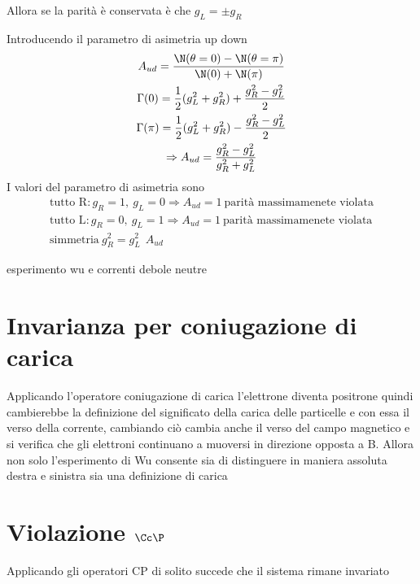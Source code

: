 \documentclass[12pt]{book}
\begin{document}
Allora se la parità è conservata è che $g_L = \pm g_R$

Introducendo il parametro di asimetria up down
\begin{gather}
	A_{ud} = \frac{\N (\theta=0) - \N(\theta=\pi)}{\N(0)+\N(\pi)}\\
	\Gamma (0) = \frac{1}{2} (g_L^2 + g_R^2) + \frac{g_R^2-g_L^2}{2}\\
	\Gamma (\pi) = \frac{1}{2} (g_L^2+g_R^2)- \frac{g_R^2-g_L^2}{2}\\
	\Rightarrow A_{ud} = \frac{g_R^2-g_L^2}{g_R^2+g_L^2}
\end{gather}
I valori del parametro di asimetria sono
\begin{gather}
	\text{tutto R}: g_R=1, \ g_L =0 \Rightarrow A_{ud}=1 \ \text{parità massimamenete violata}\\
	\text{tutto L}: g_R=0, \ g_L =1 \Rightarrow A_{ud}=1 \ \text{parità massimamenete violata}\\
	\text{simmetria} \ g_R^2 =g_L^2 \ \ A_{ud}
\end{gather}



esperimento wu e correnti debole neutre 


\section{Invarianza per coniugazione di carica}
Applicando l'operatore coniugazione di carica l'elettrone diventa positrone quindi cambierebbe la definizione del significato della carica delle particelle e con essa il verso della corrente, cambiando ciò cambia anche il verso del campo magnetico e si verifica che gli elettroni continuano a muoversi in direzione opposta a B. Allora non solo l'esperimento di Wu consente sia di distinguere in maniera assoluta destra e sinistra sia una definizione di carica


\section{Violazione $\Cc \P$}
Applicando gli operatori CP di solito succede che il sistema rimane invariato
\end{document}
